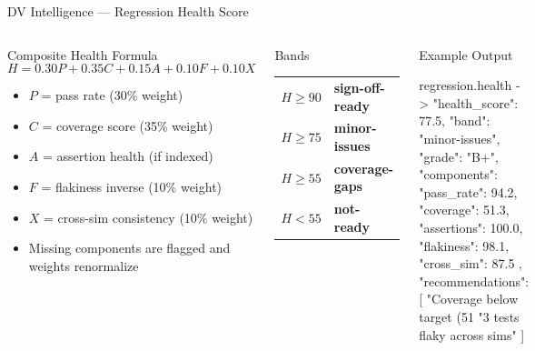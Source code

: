 \documentclass[aspectratio=169,t]{beamer}
\begin{document}
\begin{frame}[fragile]{DV Intelligence — Regression Health Score}
  \begin{columns}[T]
      \begin{block}{Composite Health Formula}
        \[
          H = 0.30 P + 0.35 C + 0.15 A + 0.10 F + 0.10 X
        \]
        \vspace{-0.5em}
        \begin{itemize}
          \item $P$ = pass rate (30\% weight)
          \item $C$ = coverage score (35\% weight)
          \item $A$ = assertion health (if indexed)
          \item $F$ = flakiness inverse (10\% weight)
          \item $X$ = cross-sim consistency (10\% weight)
          \item Missing components are flagged and weights renormalize
        \end{itemize}
      \end{block}
      \vspace{0.3em}
      \begin{block}{Bands}
        \begin{tabular}{ll}
          $H \geq 90$ & \textcolor{sdvgreen}{\textbf{sign-off-ready}} \\
          $H \geq 75$ & \textcolor{sdvblue}{\textbf{minor-issues}} \\
          $H \geq 55$ & \textcolor{sdvorange}{\textbf{coverage-gaps}} \\
          $H < 55$    & \textcolor{sdvred}{\textbf{not-ready}} \\
        \end{tabular}
      \end{block}

      \begin{exampleblock}{Example Output}
\begin{semiverbatim}\color{white}
regression.health -> {
  "health_score": 77.5,
  "band": "minor-issues",
  "grade": "B+",
  "components": {
    "pass_rate":    94.2,
    "coverage":     51.3,
    "assertions":   100.0,
    "flakiness":    98.1,
    "cross_sim":    87.5
  },
  "recommendations": [
    "Coverage below target (51%
    "3 tests flaky across sims"
  ]
}
\end{semiverbatim}
      \end{exampleblock}
  \end{columns}
\end{frame}
\end{document}
